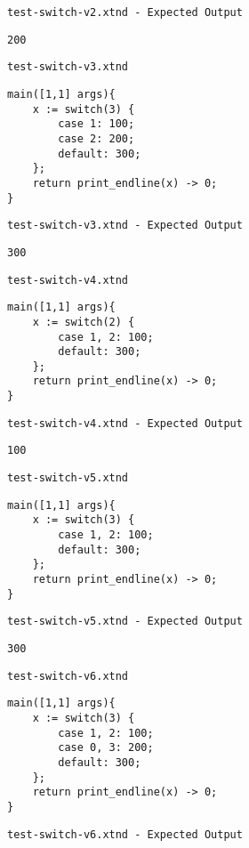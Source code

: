\medskip \noindent \texttt{test-switch-v2.xtnd - Expected Output}


\begin{lstlisting}
200
\end{lstlisting}


\medskip \noindent \texttt{test-switch-v3.xtnd}


\begin{lstlisting}
main([1,1] args){
	x := switch(3) {
		case 1: 100;
		case 2: 200;
		default: 300;
	};
	return print_endline(x) -> 0;
}
\end{lstlisting}


\medskip \noindent \texttt{test-switch-v3.xtnd - Expected Output}


\begin{lstlisting}
300
\end{lstlisting}


\medskip \noindent \texttt{test-switch-v4.xtnd}


\begin{lstlisting}
main([1,1] args){
	x := switch(2) {
		case 1, 2: 100;
		default: 300;
	};
	return print_endline(x) -> 0;
}
\end{lstlisting}


\medskip \noindent \texttt{test-switch-v4.xtnd - Expected Output}


\begin{lstlisting}
100
\end{lstlisting}


\medskip \noindent \texttt{test-switch-v5.xtnd}


\begin{lstlisting}
main([1,1] args){
	x := switch(3) {
		case 1, 2: 100;
		default: 300;
	};
	return print_endline(x) -> 0;
}
\end{lstlisting}


\medskip \noindent \texttt{test-switch-v5.xtnd - Expected Output}


\begin{lstlisting}
300
\end{lstlisting}


\medskip \noindent \texttt{test-switch-v6.xtnd}


\begin{lstlisting}
main([1,1] args){
	x := switch(3) {
		case 1, 2: 100;
		case 0, 3: 200;
		default: 300;
	};
	return print_endline(x) -> 0;
}
\end{lstlisting}


\medskip \noindent \texttt{test-switch-v6.xtnd - Expected Output}


